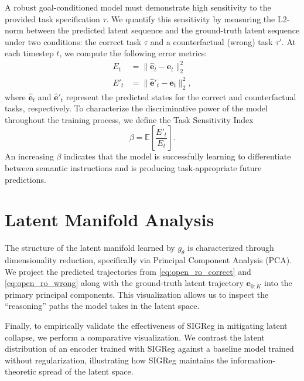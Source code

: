 A robust goal-conditioned model must demonstrate high sensitivity to the provided task specification $\tau$. We quantify this sensitivity by measuring the L2-norm between the predicted latent sequence and the ground-truth latent sequence under two conditions: the correct task $\tau$ and a counterfactual (wrong) task $\tau'$. At each timestep $t$, we compute the following error metrics:
\begin{subequations}
	\begin{align}
		E_t  & = \| \hat{\mathbf{e}}_{t} - \mathbf{e}_{t} \|^2_2 \label{eq:err_ro_correct}  \\
		E'_t & = \| \hat{\mathbf{e}}'_{t} - \mathbf{e}_{t} \|^2_2 , \label{eq:err_ro_wrong}
	\end{align}
\end{subequations}
where $\hat{\mathbf{e}}_{t}$ and $\hat{\mathbf{e}}'_{t}$ represent the predicted states for the correct and counterfactual tasks, respectively. To characterize the discriminative power of the model throughout the training process, we define the Task Sensitivity Index
\begin{equation}
	\beta = \mathbb{E}\left[\frac{E'_t}{E_t}\right] .
	\label{eq:task_sens}
\end{equation}
An increasing $\beta$ indicates that the model is successfully learning to differentiate between semantic instructions and is producing task-appropriate future predictions.


\section{Latent Manifold Analysis}
\label{sec:manifold_analysis}

The structure of the latent manifold learned by $g_\theta$ is characterized through dimensionality reduction, specifically via Principal Component Analysis (PCA). We project the predicted trajectories from \cref{eq:open_ro_correct} and \cref{eq:open_ro_wrong} along with the ground-truth latent trajectory $\mathbf{e}_{0:K}$ into the primary principal components. This visualization allows us to inspect the ``reasoning'' paths the model takes in the latent space.

Finally, to empirically validate the effectiveness of SIGReg in mitigating latent collapse, we perform a comparative visualization. We contrast the latent distribution of an encoder trained with SIGReg against a baseline model trained without regularization, illustrating how SIGReg maintains the information-theoretic spread of the latent space.


